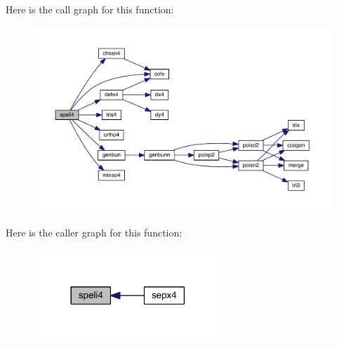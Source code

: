 Here is the call graph for this function\+:\nopagebreak
\begin{figure}[H]
\begin{center}
\leavevmode
\includegraphics[width=350pt]{de/dd4/poisson_8f_a5dc2044995a8b7eba5b7d6e919f893e1_cgraph}
\end{center}
\end{figure}




Here is the caller graph for this function\+:\nopagebreak
\begin{figure}[H]
\begin{center}
\leavevmode
\includegraphics[width=201pt]{de/dd4/poisson_8f_a5dc2044995a8b7eba5b7d6e919f893e1_icgraph}
\end{center}
\end{figure}


\hypertarget{poisson_8f_a3734e68dfa3022162c3f94650a43d8d9}{}
